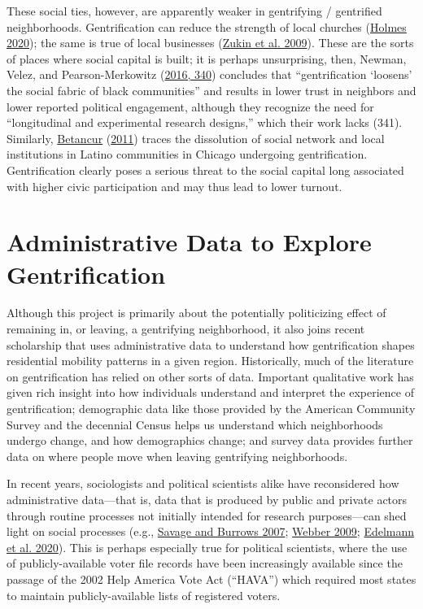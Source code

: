 \documentclass[
  12pt,
]{article}
\begin{document}
These social ties, however, are apparently weaker in gentrifying / gentrified neighborhoods. Gentrification can reduce the strength of local churches (\protect\hyperlink{ref-Holmes2020}{Holmes 2020}); the same is true of local businesses (\protect\hyperlink{ref-Zukin2009}{Zukin et al. 2009}). These are the sorts of places where social capital is built; it is perhaps unsurprising, then, Newman, Velez, and Pearson-Merkowitz (\protect\hyperlink{ref-Newman2016}{2016, 340}) concludes that ``gentrification `loosens' the social fabric of black communities'' and results in lower trust in neighbors and lower reported political engagement, although they recognize the need for ``longitudinal and experimental research designs,'' which their work lacks (341). Similarly, \protect\hyperlink{ref-Betancur2011}{Betancur} (\protect\hyperlink{ref-Betancur2011}{2011}) traces the dissolution of social network and local institutions in Latino communities in Chicago undergoing gentrification. Gentrification clearly poses a serious threat to the social capital long associated with higher civic participation and may thus lead to lower turnout.

\hypertarget{administrative-data-to-explore-gentrification}{%
\section{Administrative Data to Explore Gentrification}\label{administrative-data-to-explore-gentrification}}

Although this project is primarily about the potentially politicizing effect of remaining in, or leaving, a gentrifying neighborhood, it also joins recent scholarship that uses administrative data to understand how gentrification shapes residential mobility patterns in a given region. Historically, much of the literature on gentrification has relied on other sorts of data. Important qualitative work has given rich insight into how individuals understand and interpret the experience of gentrification; demographic data like those provided by the American Community Survey and the decennial Census helps us understand which neighborhoods undergo change, and how demographics change; and survey data provides further data on where people move when leaving gentrifying neighborhoods.

In recent years, sociologists and political scientists alike have reconsidered how administrative data---that is, data that is produced by public and private actors through routine processes not initially intended for research purposes---can shed light on social processes (e.g., \protect\hyperlink{ref-Savage2007}{Savage and Burrows 2007}; \protect\hyperlink{ref-Webber2009}{Webber 2009}; \protect\hyperlink{ref-Edelmann2020}{Edelmann et al. 2020}). This is perhaps especially true for political scientists, where the use of publicly-available voter file records have been increasingly available since the passage of the 2002 Help America Vote Act (``HAVA'') which required most states to maintain publicly-available lists of registered voters.
\end{document}
